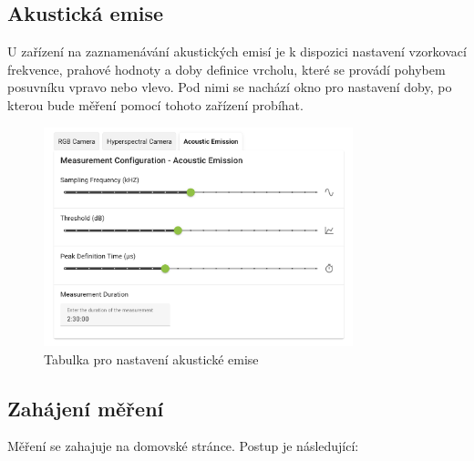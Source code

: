 \documentclass[12pt]{article}
\begin{document}
\begin{teamwork}
        \subsection{Akustická emise}\label{subsec:akusticka-emise}

        U zařízení na zaznamenávání akustických emisí je k dispozici nastavení vzorkovací frekvence, prahové hodnoty a doby
        definice vrcholu, které se provádí pohybem posuvníku vpravo nebo vlevo.
        Pod nimi se nachází okno pro nastavení
        doby, po kterou bude měření pomocí tohoto zařízení probíhat.

        \begin{figure}[hbt!]
            \centering
            \includegraphics[width=0.8\textwidth]{../../img/ae_settings}
            \caption{Tabulka pro nastavení akustické emise}
            \label{fig:ae_settings}
        \end{figure}

        \subsection{Zahájení měření}\label{subsec:zahajeni-mereni}

        Měření se zahajuje na domovské stránce.
        Postup je následující:


\end{teamwork}
\end{document}
